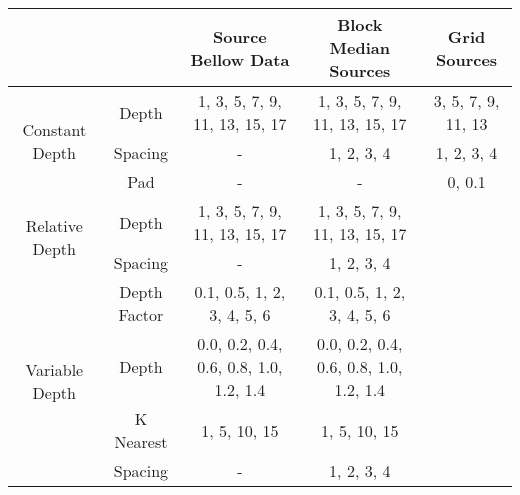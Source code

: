 \begin{tabular}{c c c c c}
& & Source Bellow Data & Block Median Sources & Grid Sources \\
\hline
\multirow{3}{*}{\parbox{0.05\linewidth}{\centering Constant Depth}}
    & Depth & 1, 3, 5, 7, 9, 11, 13, 15, 17 & 1, 3, 5, 7, 9, 11, 13, 15, 17 & 3, 5, 7, 9, 11, 13 \\
    & Spacing & - & 1, 2, 3, 4 & 1, 2, 3, 4 \\
    & Pad & - & - & 0, 0.1 \\
\hline
\multirow{2}{*}{\parbox{0.05\linewidth}{\centering Relative Depth}}
    & Depth & 1, 3, 5, 7, 9, 11, 13, 15, 17 & 1, 3, 5, 7, 9, 11, 13, 15, 17 \\
    & Spacing & - & 1, 2, 3, 4 \\
\hline
\multirow{4}{*}{\parbox{0.05\linewidth}{\centering Variable Depth}}
    & Depth Factor & 0.1, 0.5, 1, 2, 3, 4, 5, 6 & 0.1, 0.5, 1, 2, 3, 4, 5, 6 \\
    & Depth & 0.0, 0.2, 0.4, 0.6, 0.8, 1.0, 1.2, 1.4 & 0.0, 0.2, 0.4, 0.6, 0.8, 1.0, 1.2, 1.4 \\
    & K Nearest & 1, 5, 10, 15 & 1, 5, 10, 15 \\
    & Spacing & - & 1, 2, 3, 4 \\
\hline
\end{tabular}
